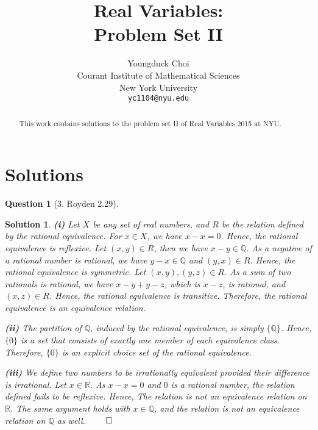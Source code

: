 \documentclass{article} %
\title{Real Variables: \\
Problem Set II}
\author{
Youngduck Choi \\
Courant Institute of Mathematical Sciences \\
New York University \\
\texttt{yc1104@nyu.edu} \\
}
\theoremstyle{quest}
\newtheorem*{question}{Question}
\newtheorem*{solution}{Solution}
\begin{document}
\maketitle

\begin{abstract}
This work contains solutions to the problem set II of Real Variables 2015 at NYU.
\end{abstract}

\section{Solutions}

\begin{question}[3. Royden 2.29]
\end{question}
\begin{solution}
\textbf{(i)} 
Let $X$ be any set of real numbers, and $R$ be the relation defined by the rational
equivalence. For $x \in X$, we have $x - x = 0$. Hence, the rational equivalence is reflexive.
Let $(x,y) \in R$, then we have $x - y \in \mathbb{Q}$. As a negative of a rational number
is rational, we have $y-x \in \mathbb{Q}$ and $(y,x) \in R$. Hence, the rational equivalence is
symmetric. Let $(x,y), (y,z) \in R$. As a sum of two rationals is rational, we have
$x - y + y - z$, which is $x-z$, is rational, and $(x,z) \in R$. Hence, the rational equivalence
is transitive. Therefore, the rational equivalence is an equivalence relation.

\smallskip

\textbf{(ii)} The partition of $\mathbb{Q}$, induced by the rational equivalence, is simply
$\{ \mathbb{Q} \}$. Hence, $\{ 0 \}$ is a set that consists of exactly one member of each
equivalence class. Therefore, $\{ 0 \}$ is an explicit choice set of the rational equivalence.

\smallskip

\textbf{(iii)} We define two numbers to be irrationally equivalent provided their difference
is irrational. Let $x \in \mathbb{R}$. As $x - x = 0$ and $0$ is a rational number, the relation
defined fails to be reflexive. Hence, The relation is not an equivalence relation on 
$\mathbb{R}$. The same 
argument holds with $x \in \mathbb{Q}$, and the relation is not an equivalence relation on 
$\mathbb{Q}$ as well. $\qed$
\end{solution}

\bigskip
\end{document}
